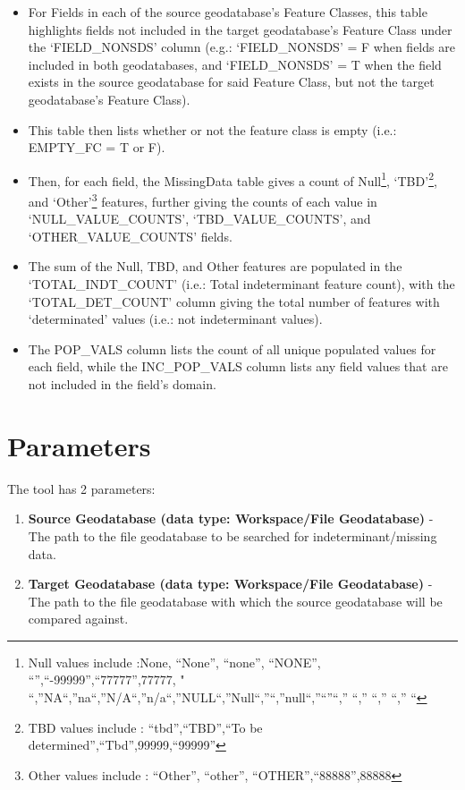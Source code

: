 \documentclass[openany]{book}
\providecommand{\tightlist}{%
  \setlength{\itemsep}{0pt}\setlength{\parskip}{0pt}}
\let\rmarkdownfootnote\footnote%
\def\footnote{\protect\rmarkdownfootnote}
\theoremstyle{definition}
\theoremstyle{definition}
\theoremstyle{definition}
\theoremstyle{remark}
\begin{document}
\begin{itemize}
  \begin{itemize}
  \tightlist
  \item
    For Fields in each of the source geodatabase's Feature Classes, this
    table highlights fields not included in the target geodatabase's
    Feature Class under the `FIELD\_NONSDS' column (e.g.:
    `FIELD\_NONSDS' = F when fields are included in both geodatabases,
    and `FIELD\_NONSDS' = T when the field exists in the source
    geodatabase for said Feature Class, but not the target geodatabase's
    Feature Class).
  \item
    This table then lists whether or not the feature class is empty
    (i.e.: EMPTY\_FC = T or F).
  \item
    Then, for each field, the MissingData table gives a count of
    Null\footnote{Null values include :None, ``None'', ``none'',
      ``NONE'', ``'',``-99999'',``77777'',77777, "
      ``,''NA``,''na``,''N/A``,''n/a``,''NULL``,''Null``,''``,''null``,''``''``,''
      ``,'' ``,'' ``,'' ``}, `TBD'\footnote{TBD values include :
      ``tbd'',``TBD'',``To be determined'',``Tbd'',99999,``99999''}, and
    `Other'\footnote{Other values include : ``Other'', ``other'',
      ``OTHER'',``88888'',88888} features, further giving the counts of
    each value in `NULL\_VALUE\_COUNTS', `TBD\_VALUE\_COUNTS', and
    `OTHER\_VALUE\_COUNTS' fields.
  \item
    The sum of the Null, TBD, and Other features are populated in the
    `TOTAL\_INDT\_COUNT' (i.e.: Total indeterminant feature count), with
    the `TOTAL\_DET\_COUNT' column giving the total number of features
    with `determinated' values (i.e.: not indeterminant values).
  \item
    The POP\_VALS column lists the count of all unique populated values
    for each field, while the INC\_POP\_VALS column lists any field
    values that are not included in the field's domain.
  \end{itemize}
\end{itemize}

\section{Parameters}\label{parameters-8}

The tool has 2 parameters:

\begin{enumerate}
\def\labelenumi{\arabic{enumi}.}
\tightlist
\item
  \textbf{Source Geodatabase (data type: Workspace/File Geodatabase)} -
  The path to the file geodatabase to be searched for
  indeterminant/missing data.
\item
  \textbf{Target Geodatabase (data type: Workspace/File Geodatabase)} -
  The path to the file geodatabase with which the source geodatabase
  will be compared against.
\end{enumerate}
\end{document}
